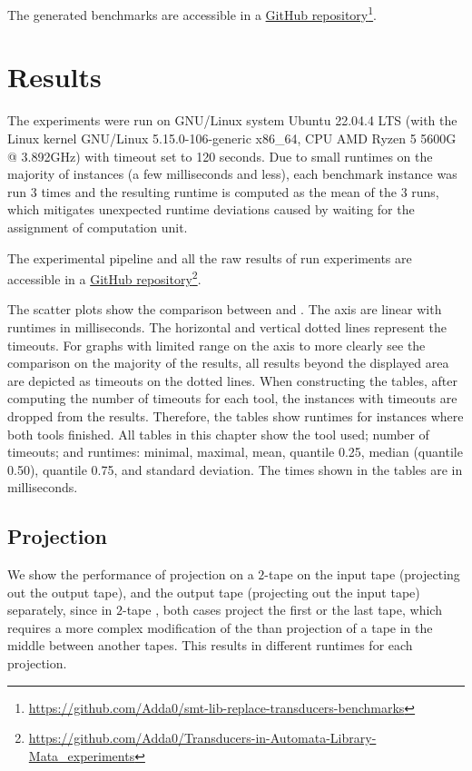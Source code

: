 The generated benchmarks are accessible in a \href{https://github.com/Adda0/smt-lib-replace-transducers-benchmarks}{GitHub repository}\footnote{\url{
https://github.com/Adda0/smt-lib-replace-transducers-benchmarks}}.

\section{Results}

The experiments were run on GNU/Linux system Ubuntu 22.04.4 LTS (with the Linux kernel GNU/Linux 5.15.0-106-generic x86\_64, CPU AMD Ryzen 5 5600G @ 3.892GHz) with timeout set to 120 seconds. Due to small runtimes on the majority of instances (a few milliseconds and less), each benchmark instance was run $3$ times and the resulting runtime is computed as the mean of the $3$ runs, which mitigates unexpected runtime deviations caused by waiting for the assignment of computation unit.

The experimental pipeline and all the raw results of run experiments are accessible in a \href{https://github.com/Adda0/Transducers-in-Automata-Library-Mata_experiments}{GitHub repository}\footnote{\url{
https://github.com/Adda0/Transducers-in-Automata-Library-Mata_experiments}}.

The scatter plots show the comparison between \mata and \mona.
The axis are linear with runtimes in milliseconds.
The horizontal and vertical dotted lines represent the timeouts.
For graphs with limited range on the axis to more clearly see the comparison on the majority of the results, all results beyond the displayed area are depicted as timeouts on the dotted lines.
When constructing the tables, after computing the number of timeouts for each tool, the instances with timeouts are dropped from the results.
Therefore, the tables show runtimes for instances where both tools finished.
All tables in this chapter show the tool used; number of timeouts; and runtimes: minimal, maximal, mean, quantile 0.25, median (quantile 0.50), quantile 0.75, and standard deviation.
The times shown in the tables are in milliseconds.

\subsection{Projection}

We show the performance of projection on a $2$-tape \nfts on the input tape (projecting out the output tape), and the output tape (projecting out the input tape) separately, since in $2$-tape \nfts, both cases project the first or the last tape, which requires a more complex modification of the \nft than projection of a tape in the middle between another tapes.
This results in different runtimes for each projection.

